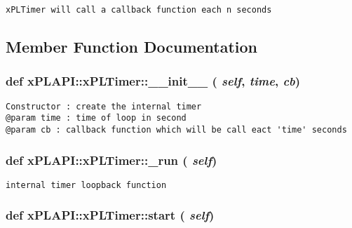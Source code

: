\footnotesize\begin{verbatim}
xPLTimer will call a callback function each n seconds
\end{verbatim}
\normalsize
 

\subsection{Member Function Documentation}
\hypertarget{classxPLAPI_1_1xPLTimer_e651d6889d77aabd9227e622d5821d14}{
\subsubsection[\_\-\_\-init\_\-\_\-]{\setlength{\rightskip}{0pt plus 5cm}def xPLAPI::xPLTimer::\_\-\_\-init\_\-\_\- ( {\em self}, \/   {\em time}, \/   {\em cb})}}
\label{classxPLAPI_1_1xPLTimer_e651d6889d77aabd9227e622d5821d14}




\footnotesize\begin{verbatim}
Constructor : create the internal timer
@param time : time of loop in second
@param cb : callback function which will be call eact 'time' seconds
\end{verbatim}
\normalsize
 \hypertarget{classxPLAPI_1_1xPLTimer_59ac53c691fadf44bf28fb74a226251f}{
\subsubsection[\_\-run]{\setlength{\rightskip}{0pt plus 5cm}def xPLAPI::xPLTimer::\_\-run ( {\em self})}}
\label{classxPLAPI_1_1xPLTimer_59ac53c691fadf44bf28fb74a226251f}




\footnotesize\begin{verbatim}
internal timer loopback function
\end{verbatim}
\normalsize
 \hypertarget{classxPLAPI_1_1xPLTimer_f9e579ecf5a8e2b2ed86ce78c5029a0e}{
\subsubsection[start]{\setlength{\rightskip}{0pt plus 5cm}def xPLAPI::xPLTimer::start ( {\em self})}}
\label{classxPLAPI_1_1xPLTimer_f9e579ecf5a8e2b2ed86ce78c5029a0e}




